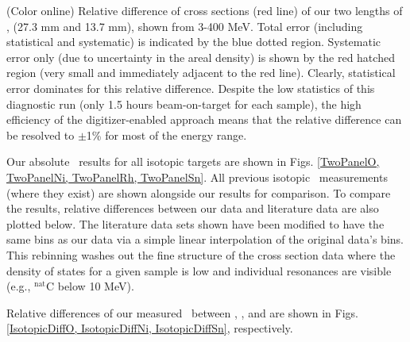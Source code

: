 (Color online) Relative difference of cross sections (red line) of
        our two lengths of \cNat, (27.3 mm and 13.7 mm), shown from 3-400
        MeV. Total error
        (including statistical and systematic) is indicated by the blue
        dotted region. Systematic error only (due to uncertainty in the areal
        density) is shown by the red hatched region (very small and immediately adjacent to 
        the red line). Clearly, statistical error dominates for this relative
        difference.
        Despite the low statistics of this diagnostic run (only 1.5 hours
        beam-on-target for each sample), the high efficiency of the
        digitizer-enabled approach means that the relative difference can be resolved to 
        $\pm$1\% for most of the energy range.


Our absolute \tot\ results for all isotopic targets are shown in Figs.
\ref{TwoPanelO, TwoPanelNi, TwoPanelRh, TwoPanelSn}. All previous isotopic \tot\
measurements (where they exist) are shown alongside our results for comparison.
To compare the results, relative differences between our data and literature
data are also plotted below. The literature
data sets shown have been modified to have the same bins as our data via a simple
linear interpolation of the original data's bins. This rebinning
washes out the fine structure of the cross section data where the density of states
for a given sample is low and individual resonances are visible
(e.g., $^{\text{nat}}$C below 10 MeV).

Relative differences of our measured \tot\ between \oSixEight, \niEightFour, and
\snTwelveFour are shown in Figs. \ref{IsotopicDiffO, IsotopicDiffNi, 
IsotopicDiffSn}, respectively. 

